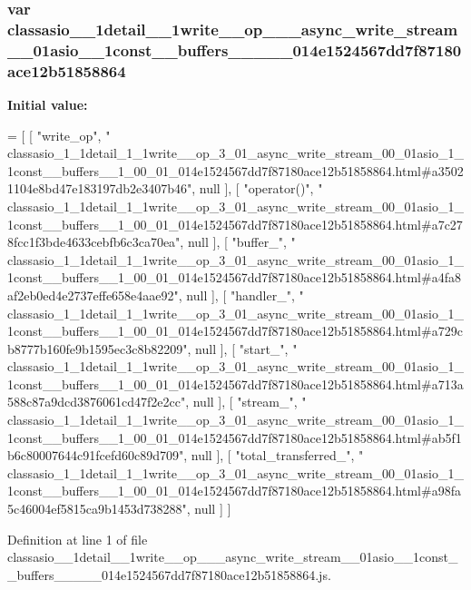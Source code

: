\subsubsection[{classasio\+\_\+1\+\_\+1detail\+\_\+1\+\_\+1write\+\_\+\+\_\+op\+\_\+3\+\_\+01\+\_\+async\+\_\+write\+\_\+stream\+\_\+00\+\_\+01asio\+\_\+1\+\_\+1const\+\_\+\+\_\+buffers\+\_\+\+\_\+1\+\_\+00\+\_\+01\+\_\+014e1524567dd7f87180ace12b51858864}]{\setlength{\rightskip}{0pt plus 5cm}var classasio\+\_\+\_\+1detail\+\_\+\_\+1write\+\_\+\+\_\+op\+\_\+\_\+\_\+async\+\_\+write\+\_\+stream\+\_\+\_\+01asio\+\_\+\_\+1const\+\_\+\+\_\+buffers\+\_\+\+\_\+\_\+\_\+\_\+014e1524567dd7f87180ace12b51858864}\label{classasio__1__1detail__1__1write____op__3__01__async__write__stream__00__01asio__1__1const____buf293717e0ff422ed2adde1fbc801cbb8_a10d0cd69dd4c72e60d7c0db812b869b6}
{\bfseries Initial value\+:}
\begin{DoxyCode}
=
[
    [ \textcolor{stringliteral}{"write\_op"}, \textcolor{stringliteral}{"
      classasio\_1\_1detail\_1\_1write\_\_op\_3\_01\_async\_write\_stream\_00\_01asio\_1\_1const\_\_buffers\_\_1\_00\_01\_014e1524567dd7f87180ace12b51858864.html#a35021104e8bd47e183197db2e3407b46"}, null ],
    [ \textcolor{stringliteral}{"operator()"}, \textcolor{stringliteral}{"
      classasio\_1\_1detail\_1\_1write\_\_op\_3\_01\_async\_write\_stream\_00\_01asio\_1\_1const\_\_buffers\_\_1\_00\_01\_014e1524567dd7f87180ace12b51858864.html#a7c278fcc1f3bde4633cebfb6c3ca70ea"}, null ],
    [ \textcolor{stringliteral}{"buffer\_"}, \textcolor{stringliteral}{"
      classasio\_1\_1detail\_1\_1write\_\_op\_3\_01\_async\_write\_stream\_00\_01asio\_1\_1const\_\_buffers\_\_1\_00\_01\_014e1524567dd7f87180ace12b51858864.html#a4fa8af2eb0ed4e2737effe658e4aae92"}, null ],
    [ \textcolor{stringliteral}{"handler\_"}, \textcolor{stringliteral}{"
      classasio\_1\_1detail\_1\_1write\_\_op\_3\_01\_async\_write\_stream\_00\_01asio\_1\_1const\_\_buffers\_\_1\_00\_01\_014e1524567dd7f87180ace12b51858864.html#a729cb8777b160fe9b1595ec3c8b82209"}, null ],
    [ \textcolor{stringliteral}{"start\_"}, \textcolor{stringliteral}{"
      classasio\_1\_1detail\_1\_1write\_\_op\_3\_01\_async\_write\_stream\_00\_01asio\_1\_1const\_\_buffers\_\_1\_00\_01\_014e1524567dd7f87180ace12b51858864.html#a713a588c87a9dcd3876061cd47f2e2cc"}, null ],
    [ \textcolor{stringliteral}{"stream\_"}, \textcolor{stringliteral}{"
      classasio\_1\_1detail\_1\_1write\_\_op\_3\_01\_async\_write\_stream\_00\_01asio\_1\_1const\_\_buffers\_\_1\_00\_01\_014e1524567dd7f87180ace12b51858864.html#ab5f1b6c80007644c91fcefd60c89d709"}, null ],
    [ \textcolor{stringliteral}{"total\_transferred\_"}, \textcolor{stringliteral}{"
      classasio\_1\_1detail\_1\_1write\_\_op\_3\_01\_async\_write\_stream\_00\_01asio\_1\_1const\_\_buffers\_\_1\_00\_01\_014e1524567dd7f87180ace12b51858864.html#a98fa5c46004ef5815ca9b1453d738288"}, null ]
]
\end{DoxyCode}


Definition at line 1 of file classasio\+\_\+\_\+1detail\+\_\+\_\+1write\+\_\+\+\_\+op\+\_\+\_\+\_\+async\+\_\+write\+\_\+stream\+\_\+\_\+01asio\+\_\+\_\+1const\+\_\+\+\_\+buffers\+\_\+\+\_\+\_\+\_\+\_\+014e1524567dd7f87180ace12b51858864.\+js.

